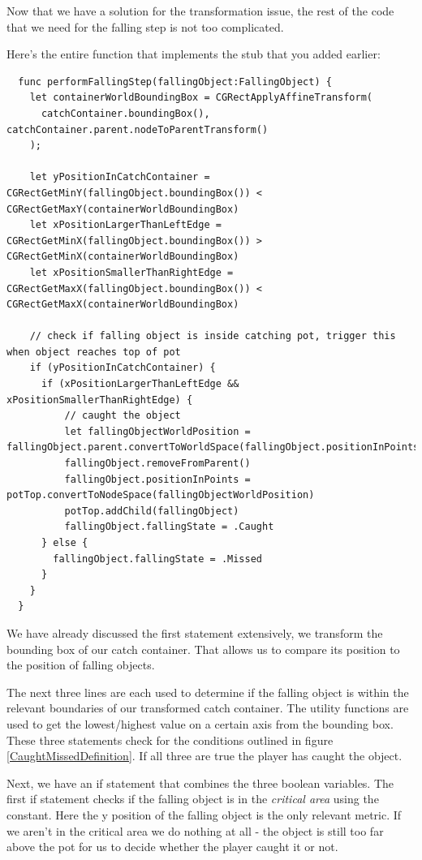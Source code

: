 Now that we have a solution for the transformation issue, the rest of the
code that we need for the falling step is not too complicated.
\begin{leftbar}
Here's the entire function that implements the stub that you added earlier:
\begin{lstlisting}
  func performFallingStep(fallingObject:FallingObject) {
    let containerWorldBoundingBox = CGRectApplyAffineTransform(
      catchContainer.boundingBox(), catchContainer.parent.nodeToParentTransform()
    );
    
    let yPositionInCatchContainer = CGRectGetMinY(fallingObject.boundingBox()) < CGRectGetMaxY(containerWorldBoundingBox)
    let xPositionLargerThanLeftEdge = CGRectGetMinX(fallingObject.boundingBox()) > CGRectGetMinX(containerWorldBoundingBox)
    let xPositionSmallerThanRightEdge = CGRectGetMaxX(fallingObject.boundingBox()) < CGRectGetMaxX(containerWorldBoundingBox)
    
    // check if falling object is inside catching pot, trigger this when object reaches top of pot
    if (yPositionInCatchContainer) {
      if (xPositionLargerThanLeftEdge && xPositionSmallerThanRightEdge) {
          // caught the object
          let fallingObjectWorldPosition = fallingObject.parent.convertToWorldSpace(fallingObject.positionInPoints)
          fallingObject.removeFromParent()
          fallingObject.positionInPoints = potTop.convertToNodeSpace(fallingObjectWorldPosition)
          potTop.addChild(fallingObject)
          fallingObject.fallingState = .Caught
      } else {
        fallingObject.fallingState = .Missed
      }
    }
  }
\end{lstlisting}
\end{leftbar}

We have already discussed the first statement extensively, we transform the
bounding box of our catch container. That allows us to compare its position to
the position of falling objects. 

The next three lines are each used to
determine if the falling object is within the relevant boundaries of our transformed catch container. The
 utility functions are used to get the
lowest/highest value on a certain axis from the bounding box. These three
statements check for the conditions outlined in figure
\ref{CaughtMissedDefinition}. If all three are true the player has caught the
object.

Next, we have an if statement that combines the three boolean variables. The
first if statement checks if the falling object is in the
\textit{critical area} using the 
constant. Here the y position of the falling object is the only relevant metric.
If we aren't in the critical area we do nothing at all - the object is still too
far above the pot for us to decide whether the player caught it or not.

